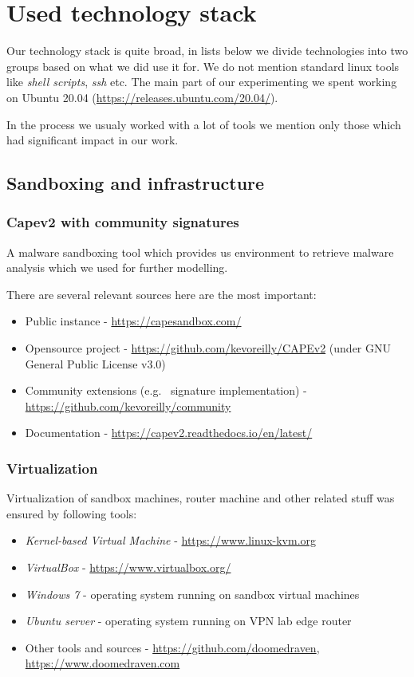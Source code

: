 \chapter{Used technology stack} \label{app:technologies}
Our technology stack is quite broad, in lists below we divide technologies into two groups based on what we did use it for. We do not mention standard linux tools like \emph{shell scripts}, \emph{ssh} etc. The main part of our experimenting we spent working on Ubuntu 20.04 (\url{https://releases.ubuntu.com/20.04/}).

In the process we usualy worked with a lot of tools we mention only those which had significant impact in our work.


\section*{Sandboxing and infrastructure}
\subsection*{Capev2 with community signatures}
A malware sandboxing tool which provides us environment to retrieve malware analysis which we used for further modelling. 

There are several relevant sources here are the most important:
\begin{itemize}
  \item Public instance - \url{https://capesandbox.com/}
  \item Opensource project -  \url{https://github.com/kevoreilly/CAPEv2} (under GNU General Public License v3.0)
  \item Community extensions (e.g. \ signature implementation) - \url{https://github.com/kevoreilly/community}
  \item Documentation - \url{https://capev2.readthedocs.io/en/latest/}
\end{itemize}

\subsection*{Virtualization}
Virtualization of sandbox machines, router machine and other related stuff was ensured by following tools:
\begin{itemize}
  \item \emph{Kernel-based Virtual Machine} - \url{https://www.linux-kvm.org}
  \item \emph{VirtualBox} - \url{https://www.virtualbox.org/}
  \item \emph{Windows 7} - operating system running on sandbox virtual machines
  \item \emph{Ubuntu server} - operating system running on VPN lab edge router
  \item Other tools and sources - \url{https://github.com/doomedraven}, \url{https://www.doomedraven.com}
\end{itemize}

